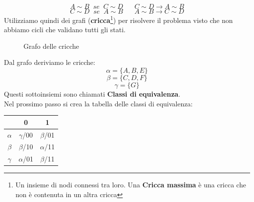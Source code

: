 \documentclass[a4paper]{article}
\theoremstyle{break}
\theoremstyle{break}
\theoremstyle{break}
\theoremstyle{break}
\begin{document}
\begin{example}
\[    A \sim B\;\;se\;\; C \sim D\;\;\;\;\;\; C \sim D \to A \sim B
    \] 
    \[
    C \sim D\;\;se\;\; A \sim B\;\;\;\;\;\; A \sim B \to C \sim D
    \] 
    Utilizziamo quindi dei grafi (\textbf{cricca}\footnote{Un insieme di nodi connessi tra loro.
    Una \textbf{Cricca massima} è una cricca che non è contenuta in un altra cricca}) per risolvere il problema visto che non abbiamo cicli che
    validano tutti gli stati.
    \begin{figure}[H]
      \begin{center}
      \end{center}
      \caption{Grafo delle cricche}
    \end{figure}
    Dal grafo deriviamo le cricche:
    \[
    \alpha = \{A,B,E\} 
    \] 
    \[
    \beta = \{C,D,F\}
    \] 
    \[
    \gamma = \{G\}
    \] 
    Questi sottoinsiemi sono chiamati \textbf{Classi di equivalenza}.\\
    Nel prossimo passo si crea la tabella delle classi di equivalenza:
    \begin{table}[H]
      \begin{center}
        \begin{tabular}{c|c|c}
          & 0 & 1 \\
          \hline
          \( \alpha \) & \( \gamma \)/00 & \( \beta \)/01  \\ 
          \( \beta \) & \( \beta \)/10 & \( \alpha \)/11 \\ 
          \( \gamma \) & \( \alpha \)/01 & \( \beta \)/11 \\ 
        \end{tabular}
      \end{center}
    \end{table}
  \end{example}
\end{document}
